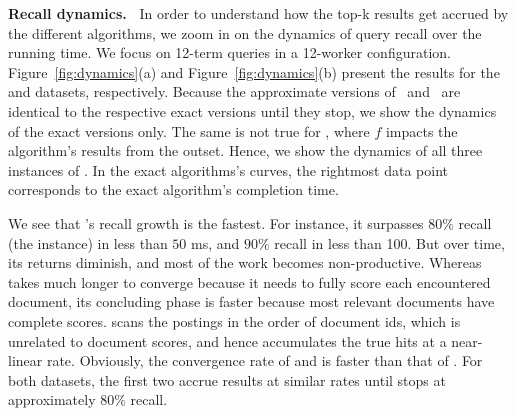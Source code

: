 {\bf Recall dynamics.\ } 
In order to understand how the top-k results get accrued by the different algorithms, we zoom in on the dynamics of query 
recall over the running time. We focus on 12-term queries in a 12-worker configuration. 
Figure~\ref{fig:dynamics}(a) and Figure~\ref{fig:dynamics}(b) present the results for the \cw\/ and \cwten\/ datasets, respectively. 
Because the approximate versions of \alg\ and \pRA\ are  identical to the respective exact versions until they stop, 
we show the dynamics of the exact versions only.  The same is not true for \pBMW, where $f$ impacts the algorithm's results from the outset.
Hence, we show the dynamics of all three instances of \pBMW. 
In the exact algorithms's curves, the rightmost data point corresponds to the exact algorithm's completion time.   

We see that \alg's recall growth is the fastest. For instance, it surpasses $80\%$ recall (the \alg\lo\/ instance) in less than $50$ ms, 
and $90\%$ recall in less than 100. But over time, its returns  diminish, and most of the work becomes non-productive. Whereas
\pRA\/ takes much longer to converge because it needs to fully score each encountered document,  its concluding phase is faster because 
most relevant documents   have complete  scores. 
\pBMW\/ scans the postings in the order of document ids, which is unrelated to document scores, and hence accumulates the true hits 
at a near-linear rate. Obviously, the convergence rate of \pBMW\hi\/ and \pBMW\lo\/ is faster than that of \pBMW\ex. For both datasets, the first 
two accrue results at similar rates until \pBMW\lo\/ stops at approximately $80\%$ recall. 

